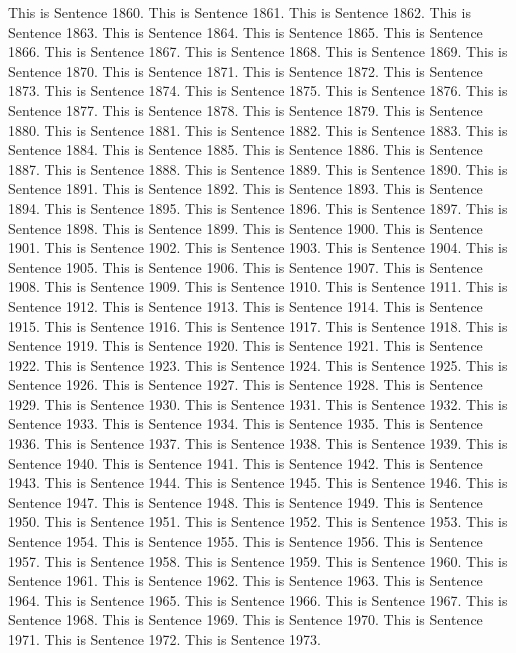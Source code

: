 \documentclass{article}
\begin{document}
This is Sentence 1860.
This is Sentence 1861.
This is Sentence 1862.
This is Sentence 1863.
This is Sentence 1864.
This is Sentence 1865.
This is Sentence 1866.
This is Sentence 1867.
This is Sentence 1868.
This is Sentence 1869.
This is Sentence 1870.
This is Sentence 1871.
This is Sentence 1872.
This is Sentence 1873.
This is Sentence 1874.
This is Sentence 1875.
This is Sentence 1876.
This is Sentence 1877.
This is Sentence 1878.
This is Sentence 1879.
This is Sentence 1880.
This is Sentence 1881.
This is Sentence 1882.
This is Sentence 1883.
This is Sentence 1884.
This is Sentence 1885.
This is Sentence 1886.
This is Sentence 1887.
This is Sentence 1888.
This is Sentence 1889.
This is Sentence 1890.
This is Sentence 1891.
This is Sentence 1892.
This is Sentence 1893.
This is Sentence 1894.
This is Sentence 1895.
This is Sentence 1896.
This is Sentence 1897.
This is Sentence 1898.
This is Sentence 1899.
This is Sentence 1900.
This is Sentence 1901.
This is Sentence 1902.
This is Sentence 1903.
This is Sentence 1904.
This is Sentence 1905.
This is Sentence 1906.
This is Sentence 1907.
This is Sentence 1908.
This is Sentence 1909.
This is Sentence 1910.
This is Sentence 1911.
This is Sentence 1912.
This is Sentence 1913.
This is Sentence 1914.
This is Sentence 1915.
This is Sentence 1916.
This is Sentence 1917.
This is Sentence 1918.
This is Sentence 1919.
This is Sentence 1920.
This is Sentence 1921.
This is Sentence 1922.
This is Sentence 1923.
This is Sentence 1924.
This is Sentence 1925.
This is Sentence 1926.
This is Sentence 1927.
This is Sentence 1928.
This is Sentence 1929.
This is Sentence 1930.
This is Sentence 1931.
This is Sentence 1932.
This is Sentence 1933.
This is Sentence 1934.
This is Sentence 1935.
This is Sentence 1936.
This is Sentence 1937.
This is Sentence 1938.
This is Sentence 1939.
This is Sentence 1940.
This is Sentence 1941.
This is Sentence 1942.
This is Sentence 1943.
This is Sentence 1944.
This is Sentence 1945.
This is Sentence 1946.
This is Sentence 1947.
This is Sentence 1948.
This is Sentence 1949.
This is Sentence 1950.
This is Sentence 1951.
This is Sentence 1952.
This is Sentence 1953.
This is Sentence 1954.
This is Sentence 1955.
This is Sentence 1956.
This is Sentence 1957.
This is Sentence 1958.
This is Sentence 1959.
This is Sentence 1960.
This is Sentence 1961.
This is Sentence 1962.
This is Sentence 1963.
This is Sentence 1964.
This is Sentence 1965.
This is Sentence 1966.
This is Sentence 1967.
This is Sentence 1968.
This is Sentence 1969.
This is Sentence 1970.
This is Sentence 1971.
This is Sentence 1972.
This is Sentence 1973.
\end{document}
